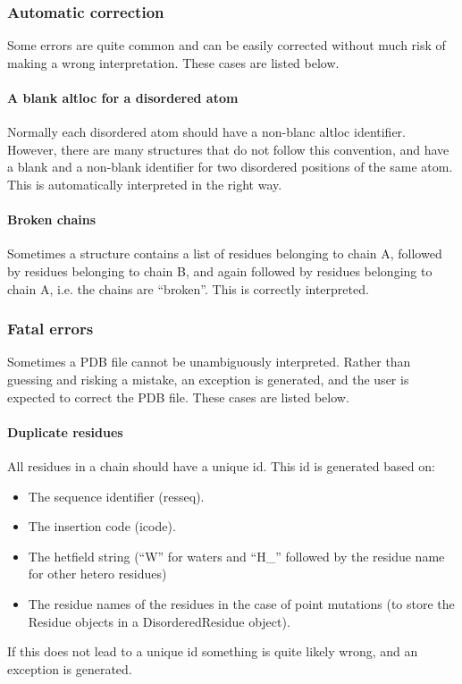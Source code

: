 \documentclass{report}
\begin{document}
\subsubsection{Automatic correction}

Some errors are quite common and can be easily corrected without much risk of
making a wrong interpretation. These cases are listed below.


\paragraph{A blank altloc for a disordered atom}

Normally each disordered atom should have a non-blanc altloc identifier. However,
there are many structures that do not follow this convention, and have a blank
and a non-blank identifier for two disordered positions of the same atom. This
is automatically interpreted in the right way. 


\paragraph{Broken chains}

Sometimes a structure contains a list of residues belonging to chain A, followed
by residues belonging to chain B, and again followed by residues belonging to
chain A, i.e. the chains are {}``broken{}''. This is correctly interpreted.


\subsubsection{Fatal errors}

Sometimes a PDB file cannot be unambiguously interpreted. Rather than guessing
and risking a mistake, an exception is generated, and the user is expected to
correct the PDB file. These cases are listed below.


\paragraph{Duplicate residues}

All residues in a chain should have a unique id. This id is generated based
on:

\begin{itemize}
\item The sequence identifier (resseq).
\item The insertion code (icode).
\item The hetfield string ({}``W{}'' for waters and {}``H\_{}'' followed by the
residue name for other hetero residues) 
\item The residue names of the residues in the case of point mutations (to store the
Residue objects in a DisorderedResidue object).
\end{itemize}
If this does not lead to a unique id something is quite likely wrong, and an
exception is generated.
\end{document}

